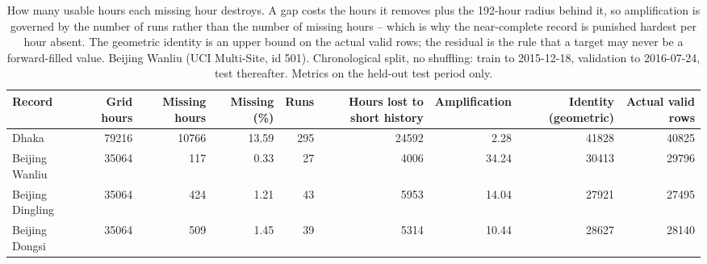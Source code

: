 \begin{table}[htbp]
\caption{How many usable hours each missing hour destroys. A gap costs the hours it removes plus the 192-hour radius behind it, so amplification is governed by the number of runs rather than the number of missing hours -- which is why the near-complete record is punished hardest per hour absent. The geometric identity is an upper bound on the actual valid rows; the residual is the rule that a target may never be a forward-filled value. Beijing Wanliu (UCI Multi-Site, id 501). Chronological split, no shuffling: train to 2015-12-18, validation to 2016-07-24, test thereafter. Metrics on the held-out test period only.}
\label{tab:amplification_by_record}
\begin{tabular}{lrrrrrrrr}
\toprule
Record & Grid hours & Missing hours & Missing (\%) & Runs & Hours lost to short history & Amplification & Identity (geometric) & Actual valid rows \\
\midrule
Dhaka & 79216 & 10766 & 13.59 & 295 & 24592 & 2.28 & 41828 & 40825 \\
Beijing Wanliu & 35064 & 117 & 0.33 & 27 & 4006 & 34.24 & 30413 & 29796 \\
Beijing Dingling & 35064 & 424 & 1.21 & 43 & 5953 & 14.04 & 27921 & 27495 \\
Beijing Dongsi & 35064 & 509 & 1.45 & 39 & 5314 & 10.44 & 28627 & 28140 \\
\bottomrule
\end{tabular}
\end{table}
